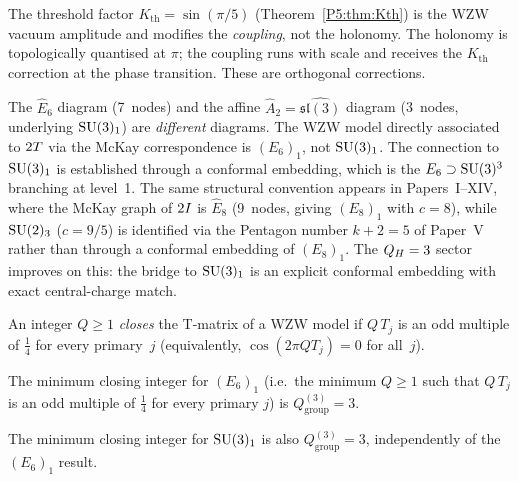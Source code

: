 \begin{remark}
\label{P5:rem:kth_relation}
The threshold factor $K_{\mathrm{th}}=\sin(\pi/5)$ (Theorem~\ref{P5:thm:Kth})
is the WZW vacuum amplitude and modifies the \emph{coupling}, not the
holonomy.  The holonomy is topologically quantised at $\pi$; the
coupling runs with scale and receives the $K_{\mathrm{th}}$ correction
at the phase transition.  These are orthogonal corrections.
\end{remark}

\begin{remark}
\label{P15:rem:mckay_chain_clarification}
The $\widehat{E}_6$ diagram (7~nodes) and the affine
$\widehat{A}_2=\widehat{\mathfrak{sl}(3)}$ diagram (3~nodes,
underlying $\mathrm{SU}(3)_1$) are \emph{different} diagrams.
The WZW model directly associated to $2T$ via the McKay
correspondence is $(E_6)_1$, not $\mathrm{SU}(3)_1$.
The connection to $\mathrm{SU}(3)_1$ is established through a
conformal embedding, which is
the $E_6\supset\mathrm{SU}(3)^3$ branching at level~1.
The same structural convention appears in Papers~I--XIV,
where the McKay graph of $2I$ is $\widehat{E}_8$ (9~nodes,
giving $(E_8)_1$ with $c=8$), while $\mathrm{SU}(2)_3$ ($c=9/5$)
is identified via the Pentagon number $k+2=5$ of Paper~V
rather than through a conformal embedding of $(E_8)_1$.
The $Q_H=3$ sector improves on this: the bridge to $\mathrm{SU}(3)_1$
is an explicit conformal embedding with exact central-charge match.
\end{remark}

\begin{definition}
\label{P15:def:closes_tmatrix}
An integer $Q\geq 1$ \emph{closes} the T-matrix of a WZW model
if $Q\,T_j$ is an odd multiple of $\tfrac{1}{4}$ for every primary~$j$
(equivalently, $\cos(2\pi Q T_j)=0$ for all~$j$).
\end{definition}

\begin{theorem}
\label{P15:thm:QgroupE6}
The minimum closing integer for $(E_6)_1$ (i.e.\ the minimum $Q\geq1$
such that $Q\,T_j$ is an odd multiple of $\tfrac{1}{4}$ for every primary $j$)
is $Q_{\mathrm{group}}^{(3)}=3$.
\end{theorem}

\begin{theorem}
\label{P15:thm:Qgroup3}
The minimum closing integer for $\mathrm{SU}(3)_1$ is also
$Q_{\mathrm{group}}^{(3)}=3$, independently of the $(E_6)_1$ result.
\end{theorem}

